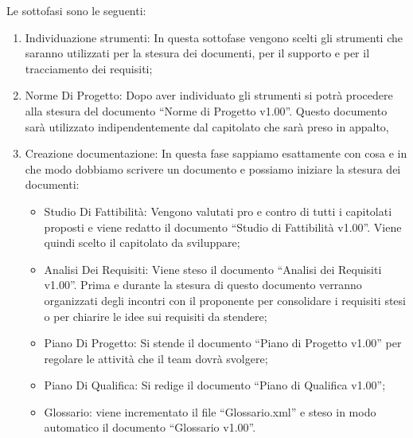 \documentclass[../PianoProgetto.tex]{subfiles}
\begin{document}
	Le sottofasi sono le seguenti:
	\begin{enumerate}
		\item Individuazione strumenti: In questa sottofase vengono scelti gli strumenti che saranno utilizzati per la stesura dei documenti, per il supporto e per il tracciamento dei requisiti;
		\item Norme Di Progetto: Dopo aver individuato gli strumenti si potrà procedere alla stesura del documento “Norme di Progetto v1.00”. Questo documento sarà utilizzato indipendentemente dal capitolato che sarà preso in appalto,
		\item Creazione documentazione: In questa fase sappiamo esattamente con cosa e in che modo dobbiamo scrivere un documento e possiamo iniziare la stesura dei documenti:
		\begin{itemize}
		\item Studio Di Fattibilità: Vengono valutati pro e contro di tutti i capitolati proposti e viene redatto il documento “Studio di Fattibilità v1.00”. Viene quindi scelto il capitolato da sviluppare;
		\item Analisi Dei Requisiti: Viene steso il documento “Analisi dei Requisiti v1.00”. Prima e durante la stesura di questo documento verranno organizzati degli incontri con il proponente per consolidare i requisiti stesi o per chiarire le idee sui requisiti da stendere;
		\item Piano Di Progetto: Si stende il documento “Piano di Progetto v1.00” per regolare le attività che il team dovrà svolgere;
		\item Piano Di Qualifica: Si redige il documento “Piano di Qualifica v1.00”;
		\item Glossario: viene incrementato il file “Glossario.xml” e steso in modo automatico il documento “Glossario v1.00”.

		\end{itemize}
		

\end{enumerate}
\end{document}
